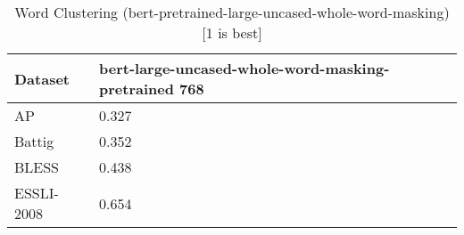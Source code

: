 \begin{table}[]
\centering
\begin{tabular}{l|l}
\hline
Dataset & bert-large-uncased-whole-word-masking-pretrained 768 \\
\hline
AP & 0.327 \\ 
Battig & 0.352 \\ 
BLESS & 0.438 \\ 
ESSLI-2008 & 0.654
\end{tabular}
\caption{Word Clustering (bert-pretrained-large-uncased-whole-word-masking) [1 is best]}
\label{tab:cluster-bert-pretrained-large-uncased-whole-word-masking}
\end{table}
